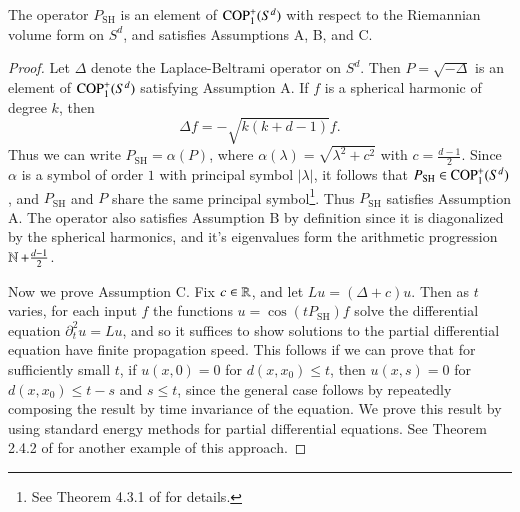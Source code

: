 \begin{lemma} \label{lemmaoijioawjdioawjdw}
  The operator $P_{\text{SH}}$ is an element of ${\text{COP}^{+}_{{1}}}(S^d)$ with respect to the Riemannian volume form on $S^d$, and satisfies Assumptions A, B, and C.
\end{lemma}
\begin{proof}
  Let $\Delta$ denote the Laplace-Beltrami operator on $S^d$. Then $P = \sqrt{-\Delta}$ is an element of ${\text{COP}^{+}_{{1}}}(S^d)$ satisfying Assumption A. If $f$ is a spherical harmonic of degree $k$, then
  \begin{equation}
    \Delta f = - \sqrt{k(k+d-1)} f.
  \end{equation}
  Thus we can write $P_{\text{SH}} = \alpha(P)$, where $\alpha(\lambda) = \sqrt{ \lambda^2 + c^2 }$ with $c = \tfrac{d-1}{2}$. Since $\alpha$ is a symbol of order $1$ with principal symbol $|\lambda|$, it follows that $P_{\text{SH}} \in {\text{COP}^{+}_{{1}}}(S^d)$, and $P_{\text{SH}}$ and $P$ share the same principal symbol\footnote{See Theorem 4.3.1 of \cite{Sogge} for details.}. Thus $P_{\text{SH}}$ satisfies Assumption A. The operator also satisfies Assumption B by definition since it is diagonalized by the spherical harmonics, and it's eigenvalues form the arithmetic progression $\operatorname{\mathbb{N}} + \tfrac{d-1}{2}$.

  Now we prove Assumption C. Fix $c \in \operatorname{\mathbb{R}}$, and let $Lu = (\Delta + c) u$. Then as $t$ varies, for each input $f$ the functions $u = \cos(t P_{\text{SH}}) f$ solve the differential equation $\partial_t^2 u = Lu$, and so it suffices to show solutions to the partial differential equation have finite propagation speed. This follows if we can prove that for sufficiently small $t$, if $u(x,0) = 0$ for $d(x,x_0) \leq t$, then $u(x,s) = 0$ for $d(x,x_0) \leq t - s$ and $s \leq t$, since the general case follows by repeatedly composing the result by time invariance of the equation. We prove this result by using standard energy methods for partial differential equations. See Theorem 2.4.2 of \cite{SoggeHangzhou} for another example of this approach.


\end{proof}
